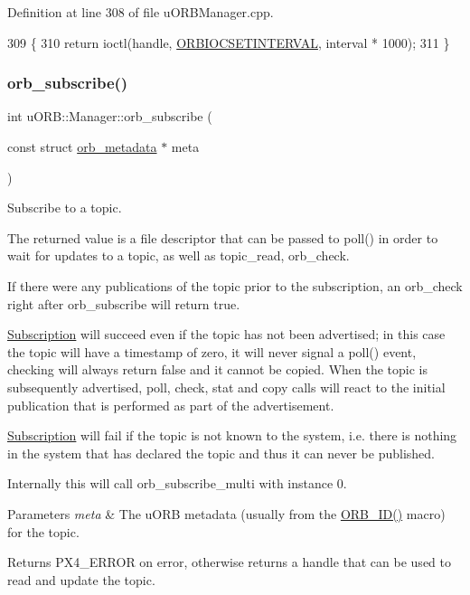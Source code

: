 Definition at line 308 of file u\+O\+R\+B\+Manager.\+cpp.


\begin{DoxyCode}
309 \{
310     \textcolor{keywordflow}{return} ioctl(handle, \hyperlink{drv__orb__dev_8h_a815da46533c3937c84c1496218659d0b}{ORBIOCSETINTERVAL}, interval * 1000);
311 \}
\end{DoxyCode}
\mbox{\label{classuORB_1_1Manager_ae54072a80ad4de6d127e2dad8182b8fb}} 
\subsubsection{\texorpdfstring{orb\+\_\+subscribe()}{orb\_subscribe()}}
{\footnotesize\ttfamily int u\+O\+R\+B\+::\+Manager\+::orb\+\_\+subscribe (\begin{DoxyParamCaption}\item[{const struct \hyperlink{structorb__metadata}{orb\+\_\+metadata} $\ast$}]{meta }\end{DoxyParamCaption})}

Subscribe to a topic.

The returned value is a file descriptor that can be passed to poll() in order to wait for updates to a topic, as well as topic\+\_\+read, orb\+\_\+check.

If there were any publications of the topic prior to the subscription, an orb\+\_\+check right after orb\+\_\+subscribe will return true.

\hyperlink{classuORB_1_1Subscription}{Subscription} will succeed even if the topic has not been advertised; in this case the topic will have a timestamp of zero, it will never signal a poll() event, checking will always return false and it cannot be copied. When the topic is subsequently advertised, poll, check, stat and copy calls will react to the initial publication that is performed as part of the advertisement.

\hyperlink{classuORB_1_1Subscription}{Subscription} will fail if the topic is not known to the system, i.\+e. there is nothing in the system that has declared the topic and thus it can never be published.

Internally this will call orb\+\_\+subscribe\+\_\+multi with instance 0.


\begin{DoxyParams}{Parameters}
{\em meta} & The u\+O\+RB metadata (usually from the \hyperlink{uORB_8h_a96af5434ec1acdf24287bd7851b0413f}{O\+R\+B\+\_\+\+I\+D()} macro) for the topic. \\
\hline
\end{DoxyParams}
\begin{DoxyReturn}{Returns}
P\+X4\+\_\+\+E\+R\+R\+OR on error, otherwise returns a handle that can be used to read and update the topic. 
\end{DoxyReturn}


